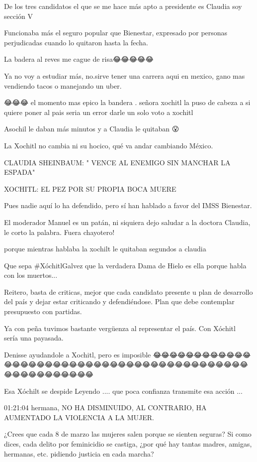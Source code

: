 De los tres candidatos el que se me hace más apto a presidente es Claudia soy sección V

Funcionaba más el seguro popular que Bienestar, expresado por personas perjudicadas cuando lo quitaron hasta la fecha.

La badera al reves me cague de risa😂😂😂😂😂

Ya no voy a estudiar más, no.sirve tener una carrera aqui en mexico, gano mas vendiendo tacos o manejando un uber.

😂😂😂 el momento mas epico la bandera .  señora xochitl la puso de cabeza a si quiere poner al pais seria un error darle un solo voto a xochitl

Asochil le daban más minutos y a Claudia le quitaban 😮

La Xochitl no cambia ni su hocico, qué va andar cambiando México.

CLAUDIA SHEINBAUM: " VENCE AL ENEMIGO SIN MANCHAR LA ESPADA" 

XOCHITL: EL PEZ POR SU PROPIA BOCA MUERE

Pues nadie aquí lo ha defendido, pero sí han hablado a favor del IMSS Bienestar.

El moderador Manuel es un patán, ni siquiera dejo saludar a la doctora Claudia, le corto la palabra. Fuera chayotero!

porque mientras hablaba la xochilt le quitaban segundos a claudia

Que sepa #XóchitlGalvez que la verdadera Dama de Hielo es ella porque habla con los muertos... 🥶💀

Reitero, basta de criticas, mejor que cada candidato presente u plan de desarrollo  del país y dejar estar criticando y defendiéndose. Plan que debe contemplar presupuesto con partidas.

Ya con peña tuvimos bastante vergüenza al representar el país. Con Xóchitl 🤣 sería una payasada.

Denisse ayudandole a Xochitl,  pero es imposible 😂😂😂😂😂😂😂😂😂😂😂😂😂😂😂😂😂😂😂😂😂😂😂😂😂😂😂😂😂😂😂😂😂😂😂😂😂😂😂😂😂😂😂😂😂😂😂😂😂😂😂😂😂

Esa Xóchilt se despide Leyendo .... que poca confianza transmite esa acción ...

01:21:04 hermana, NO HA DISMINUIDO, AL CONTRARIO, HA AUMENTADO LA VIOLENCIA A LA MUJER.

¿Crees que cada 8 de marzo las mujeres salen porque se sienten seguras? 
Si como dices, cada delito por feminicidio se castiga, ¿por qué hay tantas madres, amigas, hermanas, etc. pidiendo justicia en cada marcha?


